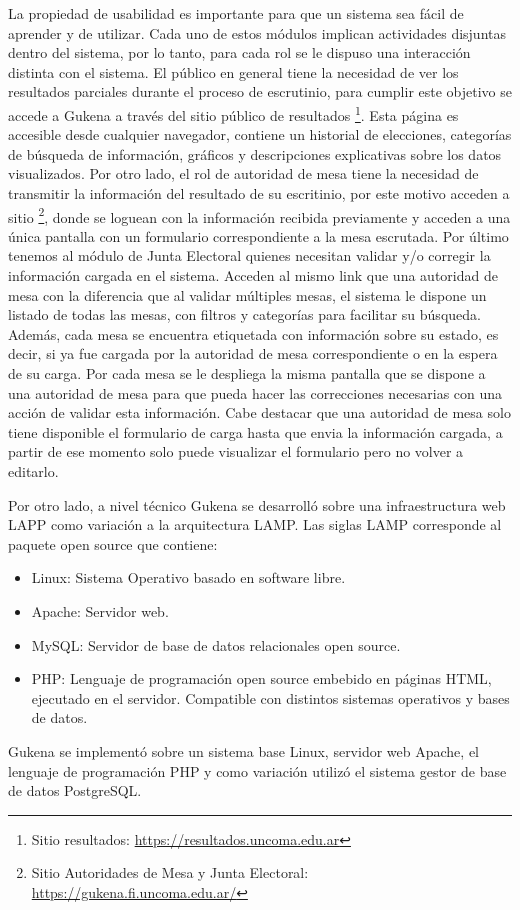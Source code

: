 La propiedad de usabilidad es importante para que un sistema sea fácil de aprender y de utilizar. Cada uno de estos módulos implican actividades disjuntas dentro del sistema, por lo tanto, para cada rol se le dispuso una interacción distinta con el sistema. \newline
El público en general tiene la necesidad de ver los resultados parciales durante el proceso de escrutinio, para cumplir este objetivo se accede a Gukena a través del sitio público de resultados \footnote{Sitio resultados: \url{https://resultados.uncoma.edu.ar}}.
Esta página es accesible desde cualquier navegador, contiene un historial de elecciones, categorías de búsqueda de información, gráficos y descripciones explicativas sobre los datos visualizados. Por otro lado, el rol de autoridad de mesa tiene la necesidad de transmitir la información del resultado de su escritinio, por este motivo acceden a sitio \footnote{Sitio Autoridades de Mesa y Junta Electoral: \url{https://gukena.fi.uncoma.edu.ar/}},
donde se loguean con la información recibida previamente y acceden a una única pantalla con un formulario correspondiente a la mesa escrutada. Por último tenemos al módulo de Junta Electoral quienes necesitan validar y/o corregir la información cargada en el sistema. Acceden al mismo link que una autoridad de mesa con la diferencia que al validar múltiples mesas, el sistema le dispone un listado de todas las mesas, con filtros y categorías para facilitar su búsqueda. Además, cada mesa se encuentra etiquetada con información sobre su estado, es decir, si ya fue cargada por la autoridad de mesa correspondiente o en la espera de su carga. Por cada mesa se le despliega la misma pantalla que se dispone a una autoridad de mesa para que pueda hacer las correcciones necesarias con una acción de validar esta información. Cabe destacar que una autoridad de mesa solo tiene disponible el formulario de carga hasta que envia la información cargada, a partir de ese momento solo puede visualizar el formulario pero no volver a editarlo.\newline

Por otro lado, a nivel técnico Gukena se desarrolló sobre una infraestructura web LAPP como variación a la arquitectura LAMP. Las siglas LAMP corresponde al paquete open source  \cite{chaparro2006lamp} que contiene: 
\begin{itemize}
    \item Linux: Sistema Operativo basado en software libre.
    \item Apache: Servidor web.
    \item MySQL: Servidor de base de datos relacionales open source.
    \item PHP: Lenguaje de programación open source embebido en páginas HTML, ejecutado en el servidor. Compatible con distintos sistemas operativos y bases de datos.
\end{itemize} Gukena se implementó sobre un sistema base Linux, servidor web Apache, el lenguaje de programación PHP y como variación utilizó el sistema gestor de base de datos PostgreSQL. 


